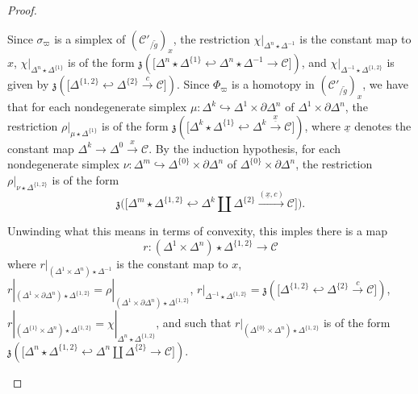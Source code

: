 \documentclass{tac}
\newcommand{\f}[1]{\mathfrak{#1}}
\newcommand{\s}[1]{\mathscr{#1}}
\newcommand{\ul}[1]{\underline{#1}}
\begin{document}
\begin{proof}
\begin{itemize}
Since $\sigma_\varpi$ is a simplex of $(\s{C}'_{/ \tilde{g}})_x$, the restriction $\chi |_{\Delta^n \star \Delta^{-1}}$ is the constant map to $x$, $\chi |_{\Delta^n \star \Delta^{\{1\}}}$ is of the form $\f{z}\left( \big[ \Delta^n \star \Delta^{\{1\}} \hookleftarrow \Delta^n \star \Delta^{-1} \to \s{C} \big] \right)$, and $\chi |_{\Delta^{-1} \star \Delta^{\{1,2 \}}}$ is given by $\f{z}\left( \big[ \Delta^{\{1,2\}} \hookleftarrow \Delta^{\{ 2 \}}  \xrightarrow{c} \s{C} \big] \right)$.  Since $\Phi_\varpi$ is a homotopy in $(\s{C}'_{/ \tilde{g}})_x$, we have that for each nondegenerate simplex $\mu : \Delta^k \hookrightarrow \Delta^1 \times \partial \Delta^n$ of $\Delta^1 \times \partial \Delta^n$, the restriction $\rho |_{\mu \star \Delta^{\{1 \}}}$ is of the form $\f{z} \left( \big[ \Delta^k \star \Delta^{\{1 \}} \hookleftarrow \Delta^k \xrightarrow{\ul{x}} \s{C} \big] \right)$, where $\ul{x}$ denotes the constant map $ \Delta^k \to \Delta^0 \xrightarrow{x} \s{C}$.  By the induction hypothesis, for each nondegenerate simplex $\nu : \Delta^m \hookrightarrow \Delta^{\{0\}} \times \partial \Delta^n$ of $\Delta^{\{0\}} \times \partial \Delta^n$, the restriction  $\rho |_{\nu \star \Delta^{\{1,2 \}}}$ is of the form \[\f{z} \big( \big[ \Delta^m \star \Delta^{\{1,2 \}} \hookleftarrow \Delta^k \coprod \Delta^{\{2\}} \xrightarrow{(\ul{x} , c)} \s{C} \big] \big).\]

Unwinding what this means in terms of convexity, this imples there is a map \[r : (\Delta^1 \times \Delta^n) \star \Delta^{\{1, 2 \}} \to \s{C}\] where $r |_{(\Delta^1 \times \Delta^n) \star \Delta^{-1}}$ is the constant map to $x$, $r |_{(\Delta^1 \times \partial \Delta^n) \star \Delta^{\{1,2\}}}= \rho |_{(\Delta^1 \times \partial \Delta^n) \star \Delta^{\{1,2 \}}}$, $r|_{\Delta^{-1} \star \Delta^{\{1,2\}}} = \f{z}\left( \big[ \Delta^{\{1,2\}} \hookleftarrow \Delta^{\{ 2 \}}  \xrightarrow{c} \s{C} \big] \right)$, $r |_{(\Delta^{\{1 \}} \times \Delta^n) \star \Delta^{\{1, 2 \}} } = \chi |_{\Delta^n \star \Delta^{\{1, 2 \}}}$, and such that $r |_{(\Delta^{\{0 \}} \times \Delta^n) \star \Delta^{\{1, 2 \}} }$ is of the form $\f{z}\left( \big[ \Delta^n \star \Delta^{\{1, 2 \}} \hookleftarrow \Delta^n \coprod \Delta^{\{2 \}} \to \s{C} \big]  \right)$.


\end{itemize}
\end{proof}
\end{document}
